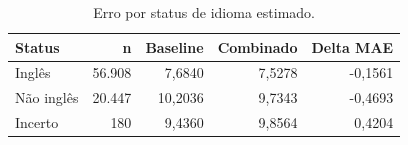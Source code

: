 \begin{table}[!htbp]\centering\small
\caption{Erro por status de idioma estimado.}
\begin{tabularx}{\linewidth}{Xrrrr}
\toprule
Status & n & Baseline & Combinado & Delta MAE \\
\midrule
Inglês & 56.908 & 7,6840 & 7,5278 & -0,1561 \\
Não inglês & 20.447 & 10,2036 & 9,7343 & -0,4693 \\
Incerto & 180 & 9,4360 & 9,8564 & 0,4204 \\
\bottomrule\end{tabularx}
\par{}
\end{table}
